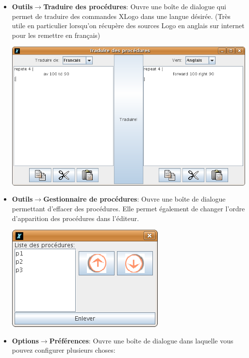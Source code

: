 \begin{itemize}
\begin{center}
\end{center}
\vspace{0.25cm}
\item \textbf{Outils$\to$Traduire des procédures}: Ouvre une boîte de dialogue qui permet de traduire des commandes XLogo dans une langue désirée. (Très utile en particulier lorsqu'on récupère des sources Logo en anglais sur internet pour les remettre en français)\\
\begin{center}
 \includegraphics[scale=0.4]{images/CaptureTraduire.png}
\end{center}
\vspace{0.25cm}
\item \textbf{Outils$\to$Gestionnaire de procédures}: Ouvre une boîte de dialogue permettant d'effacer des procédures. Elle permet également de changer l'ordre d'apparition des procédures dans l'éditeur.\\
\begin{center}
 \includegraphics[scale=0.4]{images/CaptureProcedure.png}
\end{center}
\vspace{0.25cm}
\item \textbf{Options$\to$Préférences}: Ouvre une boîte de dialogue dans laquelle vous pouvez configurer plusieurs choses:

\end{itemize}
